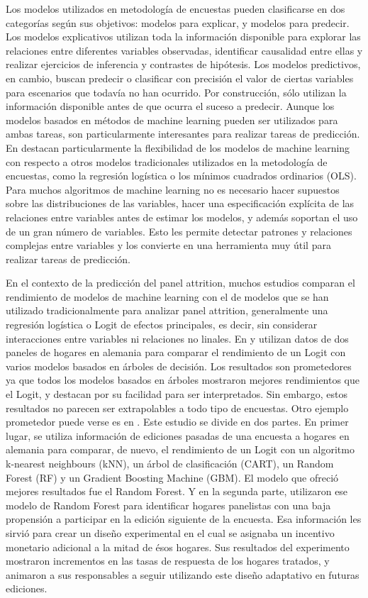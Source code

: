 Los modelos utilizados en metodología de encuestas pueden clasificarse en dos categorías según sus objetivos: modelos para explicar, y modelos para predecir. Los modelos explicativos utilizan toda la información disponible para explorar las relaciones entre diferentes variables observadas, identificar causalidad entre ellas y realizar ejercicios de inferencia y contrastes de hipótesis. Los modelos predictivos, en cambio, buscan predecir o clasificar con precisión el valor de ciertas variables para escenarios que todavía no han ocurrido. Por construcción, sólo utilizan la información disponible antes de que ocurra el suceso a predecir. Aunque los modelos basados en métodos de machine learning pueden ser utilizados para ambas tareas, son particularmente interesantes para realizar tareas de predicción. En \cite{buskirk2018introduction} destacan particularmente la flexibilidad de los modelos de machine learning con respecto a otros modelos tradicionales utilizados en la metodología de encuestas, como la regresión logística o los mínimos cuadrados ordinarios (OLS). Para muchos algoritmos de machine learning no es necesario hacer supuestos sobre las distribuciones de las variables, hacer una especificación explícita de las relaciones entre variables antes de estimar los modelos, y además soportan el uso de un gran número de variables. Esto les permite detectar patrones y relaciones complejas entre variables y los convierte en una herramienta muy útil para realizar tareas de predicción.

En el contexto de la predicción del panel attrition, muchos estudios comparan el rendimiento de modelos de machine learning con el de modelos que se han utilizado tradicionalmente para analizar panel attrition, generalmente una regresión logística o Logit de efectos principales, es decir, sin considerar interacciones entre variables ni relaciones no linales. En \cite{kern2019tree} y \cite{kern2021predicting} utilizan datos de dos paneles de hogares en alemania para comparar el rendimiento de un Logit con varios modelos basados en árboles de decisión. Los resultados son prometedores ya que todos los modelos basados en árboles mostraron mejores rendimientos que el Logit, y destacan por su facilidad para ser interpretados. Sin embargo, estos resultados no parecen ser extrapolables a todo tipo de encuestas. Otro ejemplo prometedor puede verse es en \cite{beste2023case}. Este estudio se divide en dos partes. En primer lugar, se utiliza información de ediciones pasadas de una encuesta a hogares en alemania para comparar, de nuevo, el rendimiento de un Logit con un algoritmo k-nearest neighbours (kNN), un árbol de clasificación (CART), un Random Forest (RF) y un Gradient Boosting Machine (GBM). El modelo que ofreció mejores resultados fue el Random Forest. Y en la segunda parte, utilizaron ese modelo de Random Forest para identificar hogares panelistas con una baja propensión a participar en la edición siguiente de la encuesta. Esa información les sirvió para crear un diseño experimental en el cual se asignaba un incentivo monetario adicional a la mitad de ésos hogares. Sus resultados del experimento mostraron incrementos en las tasas de respuesta de los hogares tratados, y animaron a sus responsables a seguir utilizando este diseño adaptativo en futuras ediciones.

